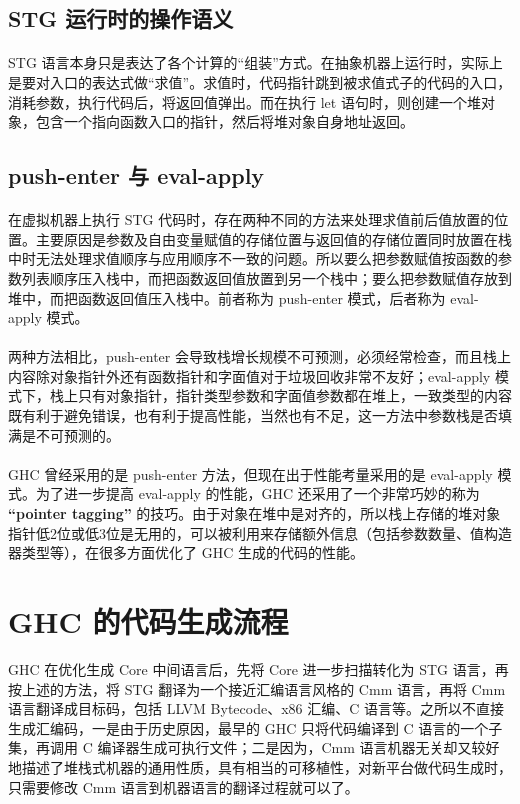 \documentclass{article}
\begin{document}
	\subsection{STG 运行时的操作语义}
	\paragraph{}
	STG 语言本身只是表达了各个计算的“组装”方式。在抽象机器上运行时，实际上是要对入口的表达式做“求值”。求值时，代码指针跳到被求值式子的代码的入口，消耗参数，执行代码后，将返回值弹出。而在执行 let 语句时，则创建一个堆对象，包含一个指向函数入口的指针，然后将堆对象自身地址返回。
	\subsection{push-enter 与 eval-apply\cite{make-fast-curry-pushenter-vs-evalapply}}
	\paragraph{}
	在虚拟机器上执行 STG 代码时，存在两种不同的方法来处理求值前后值放置的位置。主要原因是参数及自由变量赋值的存储位置与返回值的存储位置同时放置在栈中时无法处理求值顺序与应用顺序不一致的问题。所以要么把参数赋值按函数的参数列表顺序压入栈中，而把函数返回值放置到另一个栈中；要么把参数赋值存放到堆中，而把函数返回值压入栈中。前者称为 push-enter 模式，后者称为 eval-apply 模式。
	\paragraph{}
	两种方法相比，push-enter 会导致栈增长规模不可预测，必须经常检查，而且栈上内容除对象指针外还有函数指针和字面值对于垃圾回收非常不友好；eval-apply 模式下，栈上只有对象指针，指针类型参数和字面值参数都在堆上，一致类型的内容既有利于避免错误，也有利于提高性能，当然也有不足，这一方法中参数栈是否填满是不可预测的。
	\paragraph{}
	GHC 曾经采用的是 push-enter 方法\cite{implementing-lazy-functional-languages-on-stock-hardware-the-spineless-tagless-g-machine}，但现在出于性能考量采用的是 eval-apply 模式\cite{make-fast-curry-pushenter-vs-evalapply}。为了进一步提高 eval-apply 的性能，GHC 还采用了一个非常巧妙的称为 \textbf{“pointer tagging”} 的技巧。由于对象在堆中是对齐的，所以栈上存储的堆对象指针低2位或低3位是无用的，可以被利用来存储额外信息（包括参数数量、值构造器类型等），在很多方面优化了 GHC 生成的代码的性能。
	\section{GHC 的代码生成流程}
	GHC 在优化生成 Core 中间语言后，先将 Core 进一步扫描转化为 STG 语言，再按上述的方法，将 STG 翻译为一个接近汇编语言风格的 Cmm 语言，再将 Cmm 语言翻译成目标码，包括 LLVM Bytecode、x86 汇编、C 语言等。之所以不直接生成汇编码，一是由于历史原因，最早的 GHC 只将代码编译到 C 语言的一个子集，再调用 C 编译器生成可执行文件；二是因为，Cmm 语言机器无关却又较好地描述了堆栈式机器的通用性质，具有相当的可移植性，对新平台做代码生成时，只需要修改 Cmm 语言到机器语言的翻译过程就可以了。
	\medskip
	
	
\end{document}
